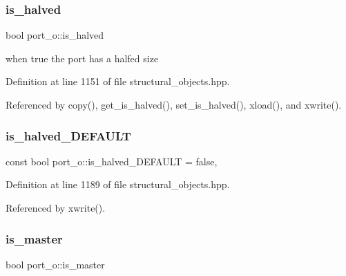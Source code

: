 \subsubsection{\texorpdfstring{is\+\_\+halved}{is\_halved}}
{\footnotesize\ttfamily bool port\+\_\+o\+::is\+\_\+halved\hspace{0.3cm}{\ttfamily [private]}}



when true the port has a halfed size 



Definition at line 1151 of file structural\+\_\+objects.\+hpp.



Referenced by copy(), get\+\_\+is\+\_\+halved(), set\+\_\+is\+\_\+halved(), xload(), and xwrite().

\mbox{\label{structport__o_a8cd104eb7d1bac7c5d3ee7014e10e7ac}} 
\subsubsection{\texorpdfstring{is\+\_\+halved\+\_\+\+D\+E\+F\+A\+U\+LT}{is\_halved\_DEFAULT}}
{\footnotesize\ttfamily const bool port\+\_\+o\+::is\+\_\+halved\+\_\+\+D\+E\+F\+A\+U\+LT = false\hspace{0.3cm}{\ttfamily [static]}, {\ttfamily [private]}}



Definition at line 1189 of file structural\+\_\+objects.\+hpp.



Referenced by xwrite().

\mbox{\label{structport__o_a9f3c1f926a4d5de280378354dca14e5e}} 
\subsubsection{\texorpdfstring{is\+\_\+master}{is\_master}}
{\footnotesize\ttfamily bool port\+\_\+o\+::is\+\_\+master\hspace{0.3cm}{\ttfamily [private]}}



